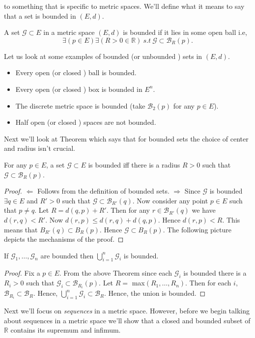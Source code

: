 to something that is specific to metric spaces. We'll define what it means to say that a set is
bounded in $(E,d)$.
\begin{Definition}
    A set $\mathcal{G} \subset E$ in a metric space $(E,d)$ is bounded if it lies in some open
    ball  i.e,
    \begin{displaymath}
	\exists \left(p \in E\right) \exists \left(R > 0 \in \mathbb{R}\right) \ s.t \ \mathcal{G}
	\subset \mathcal{B}_{R}(p).
    \end{displaymath}
\end{Definition}
Let us look at some examples of bounded (or unbounded ) sets in $(E,d)$.
\begin{itemize}
    \item Every open (or closed ) ball is bounded.
    \item Every open (or closed ) box is bounded in $E^n$.
    \item The discrete metric space is bounded (take $\mathcal{B}_2(p)$ for any $p \in E$).
    \item Half open (or closed ) spaces are not bounded.
\end{itemize}

Next we'll look at Theorem which says that for bounded sets the choice of center and radius isn't
crucial.
\begin{Theorem}[name= Bounded sets in metric space]
    For any $p \in E$, a set $\mathcal{G} \subset E$ is bounded iff there is a radius $R > 0$ such
    that $\mathcal{G} \subset \mathcal{B}_{R}(p)$.
\end{Theorem}
\begin{proof}
    $\Leftarrow$ Follows from the definition of bounded sets. $\Rightarrow$ Since $\mathcal{G}$ is
    bounded $\exists q \in E$ and $R' > 0$ such that $\mathcal{G} \subset \mathcal{B}_{R'}(q)$. Now
    consider any point $p \in E$ such that $p \neq q$. Let $R = d(q,p) + R'$. Then for any 
    $r \in \mathcal{B}_{R'}(q)$ we have $d(r,q) < R'$. Now $d(r,p) \leq d(r,q) + d(q,p)$. Hence
    $d(r,p) < R$. This means that ${B}_{R'}(q) \subset {B}_{R}(p)$. Hence $\mathcal{G} \subset
    {B}_{R}(p)$. The following picture depicts the mechanisms of the proof.
    

\end{proof}
\begin{Corollary}
    If $\mathcal{G}_1, \dots, \mathcal{G}_n$ are bounded then $\bigcup_{i=1}^{n}\mathcal{G}_i$ is
    bounded.
\end{Corollary}
\begin{proof}
    Fix a $p \in E$. From the above Theorem since each $\mathcal{G}_i$ is bounded there is a $R_i >
    0$ such that $\mathcal{G}_i \subset \mathcal{B}_{R_i}(p)$. Let $R = $ max$(R_1,\dots,R_n)$. Then
    for each $i$, $\mathcal{B}_{R_i} \subset \mathcal{B}_{R}$. Hence, $\bigcup_{i=1}^{n}
    \mathcal{G}_i \subset \mathcal{B}_{R}$. Hence, the union is bounded.  
\end{proof}
Next we'll focus on \emph{sequences} in a metric space. However, before we begin talking 
about sequences in a metric space we'll show that a closed and bounded subset 
of $\mathbb{R}$ contains its supremum and infimum.

